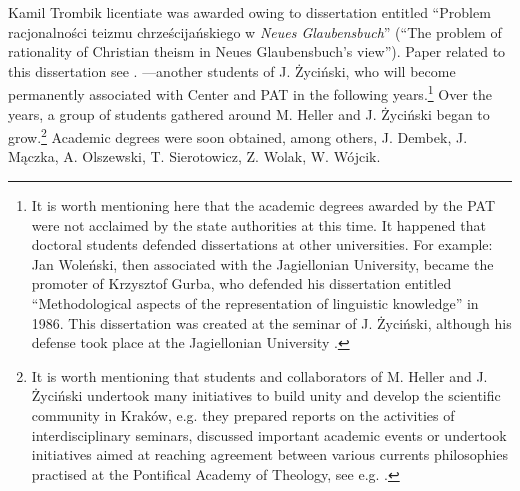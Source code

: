 \begin{artengenv}{Kamil Trombik}
{licentiate was awarded owing to dissertation entitled ``Problem racjonalności teizmu chrześcijańskiego w \textit{Neues
Glaubensbuch}'' (``The problem of rationality of Christian theism in Neues Glaubensbuch's view''). Paper related to this
dissertation see
\parencite{dadaczynski_poznanie_1984}.
}---another students of J. Życiński, who will become
permanently associated with Center and PAT in the following years.\footnote{It is worth mentioning here that the
academic degrees awarded by the PAT were not acclaimed by the state authorities at this time. It happened that doctoral
students defended dissertations at other universities. For example: Jan Woleński, then associated with the Jagiellonian
University, became the promoter of Krzysztof Gurba, who defended his dissertation entitled ``Methodological aspects of
the representation of linguistic knowledge'' in 1986. This dissertation was created at the seminar of J. Życiński,
although his defense took place at the Jagiellonian University
\parencite{wolenski_interview_2017}.
} Over the
years, a group of students gathered around M. Heller and J. Życiński began to grow.\footnote{It is worth mentioning
that students and collaborators of M. Heller and J. Życiński undertook many initiatives to build unity and develop the
scientific community in Kraków, e.g. they prepared reports on the activities of interdisciplinary seminars, discussed
important academic events or undertook initiatives aimed at reaching agreement between various currents philosophies
practised at the Pontifical Academy of Theology, see e.g.
\parencite{michalik_wstep_1984,glodz_miedzynarodowe_1987,samborski_intuicjonizm_1987,liana_w_1989,%
	dembek_matematycznosc_1990,wolak_interdyscyplinarnosc_1992,samborski_na_1992,wolak_neotomizm_1993}.
} Academic
degrees were soon obtained, among others, J. Dembek, J. Mączka, A. Olszewski, T. Sierotowicz, Z. Wolak, W. Wójcik.


\end{artengenv}
